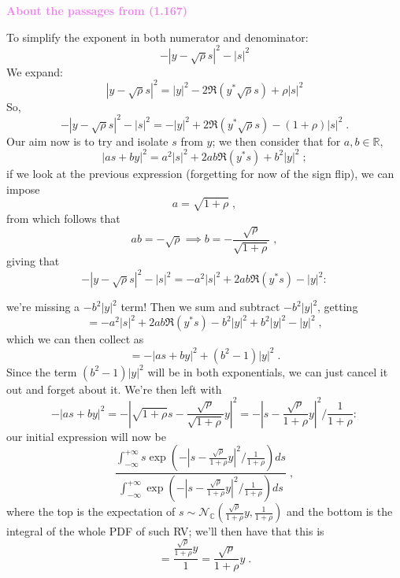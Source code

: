 \documentclass[a4paper, 12pt]{book}
\begin{document}
\begin{tcolorbox}[colframe=violet!80!white, colback=white, boxrule=1pt, arc=2pt]
    \textcolor{violet}{\textbf{About the passages from (1.167)}}

    To simplify the exponent in both numerator and denominator:
    $$
    -|y - \sqrt{\rho}s|^2 - |s|^2
    $$
    We expand:
    $$
    |y - \sqrt{\rho}s|^2 = |y|^2 - 2\Re(y^*\sqrt{\rho}s) + \rho|s|^2
    $$
    So,
    $$
    -|y - \sqrt{\rho}s|^2 - |s|^2 = -|y|^2 + 2\Re(y^*\sqrt{\rho}s) - (1+\rho)|s|^2 \;.
    $$
    Our aim now is to try and isolate $s$ from $y$; we then consider that for $a, b \in \mathbb{R}$,
    $$
    |as + by|^2 = a^2|s|^2 + 2ab\Re(y^*s) + b^2|y|^2 \;;
    $$
    if we look at the previous expression (forgetting for now of the sign flip), we can impose
    $$
    a = \sqrt{1+\rho} \;,
    $$
    from which follows that
    $$
    ab = -\sqrt{\rho} \implies b = - \frac{\sqrt{\rho}}{\sqrt{1+\rho}} \;,
    $$
    giving that
    $$
    -|y - \sqrt{\rho}s|^2 - |s|^2 = -a^2|s|^2 + 2ab\Re(y^*s) - |y|^2 :
    $$
\end{tcolorbox}
\begin{tcolorbox}[colframe=violet!80!white, colback=white, boxrule=1pt, arc=2pt]
    we're missing a $-b^2|y|^2$ term! Then we sum and subtract $-b^2|y|^2$, getting
    $$
    = -a^2|s|^2 + 2ab\Re(y^*s) - b^2|y|^2 + b^2|y|^2 - |y|^2 \;,
    $$
    which we can then collect as
    $$
    = -|as+by|^2 + (b^2-1)|y|^2 \;.
    $$
    Since the term $(b^2-1)|y|^2$ will be in both exponentials, we can just cancel it out and forget about it. We're then left with
    $$
    -|as+by|^2 = - \left| \sqrt{1+\rho}s - \frac{\sqrt{\rho}}{\sqrt{1+\rho}}y \right|^2 = - \left| s - \frac{\sqrt{\rho}}{1+\rho}y \right|^2 \bigg/ \frac{1}{1+\rho} :
    $$
    our initial expression will now be
    $$
    \frac{\int_{-\infty}^{+\infty} s \exp\left( -\left| s - \frac{\sqrt{\rho}}{1+\rho}y \right|^2 \bigg/ \frac{1}{1+\rho} \right) ds}{\int_{-\infty}^{+\infty} \exp\left( -\left| s - \frac{\sqrt{\rho}}{1+\rho}y \right|^2 \bigg/ \frac{1}{1+\rho} \right) ds} \;,
    $$
    where the top is the expectation of $s \sim \mathcal{N}_{\mathbb{C}}\left( \frac{\sqrt{\rho}}{1+\rho}y, \frac{1}{1+\rho} \right)$ and the bottom is the integral of the whole PDF of such RV; we'll then have that this is
    $$
    = \frac{\frac{\sqrt{\rho}}{1+\rho}y}{1} = \frac{\sqrt{\rho}}{1+\rho}y \;.
    $$
\end{tcolorbox}
\end{document}
